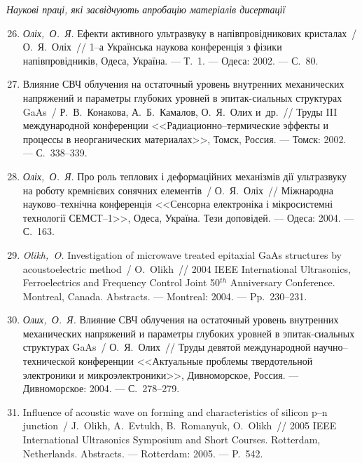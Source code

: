 \begin{center}%
\emph{Наукові праці, які засвідчують апробацію матеріалів дисертації}
\end{center}%
\begin{enumerate}[label=\arabic*.,leftmargin=2em,itemindent=0cm]
\setcounter{enumi}{25}
\item
\emph{Оліх,~О.~Я.} Ефекти активного
  ультразвуку в напівпровідникових
  кристалах~/ О.~Я.~Оліх~// 1--а {У}країнська
  наукова конференція з фізики
  напівпровідників, {О}деса, {У}країна. ---
  Т.~1. ---
  Одеса: 2002. ---
  {С.}~80.

\item
Влияние {СВЧ} облучения на остаточный
  уровень внутренних механических
  напряжений и параметры глубоких уровней в
  эпитак-сиальных структурах {G}a{A}s~/
  Р.~В.~Конакова, А.~Б.~Камалов, О.~Я.~Олих
  {и~др.}~// Труды {III} международной
  конференции <<{Р}адиационно--термические
  эффекты и процессы в неорганических
  материалах>>, {Т}омск, {Р}оссия. ---
  Томск: 2002. ---
  {С.}~338--339.

\item
\emph{Оліх,~О.~Я.} Про роль теплових і
  деформаційних механізмів дії ультразвуку
  на роботу кремнієвих сонячних елементів~/
  О.~Я.~Оліх~// Міжнародна науково--технічна
  конференція <<{С}енсорна електроніка і
  мікросистемні технології {СЕМСТ}--1>>,
  {О}деса, {У}країна. Тези доповідей. ---
  Одеса: 2004. ---
  {С.}~163.

\item
\emph{Olikh,~O.} Investigation of microwave treated epitaxial {G}a{A}s
  structures by acoustoelectric method~/ O.~Olikh~// 2004 {IEEE}
  {I}nternational {U}ltrasonics, {F}erroelectrics and {F}requency {C}ontrol
  {J}oint 50$^{th}$ {A}nniversary {C}onference. Montreal, {C}anada. Abstracts.
  ---
  Montreal: 2004. ---
  Pp.~230--231.

\item
\emph{Олих,~О.~Я.} Влияние {СВЧ} облучения на
  остаточный уровень внутренних
  механических напряжений и параметры
  глубоких уровней в эпитак-сиальных
  структурах {G}a{A}s~/ О.~Я.~Олих~// Труды девятой
  международной научно--технической
  конференции <<{А}ктуальные проблемы
  твердотельной электроники и
  микроэлектроники>>, {Д}ивноморское,
  {Р}оссия. ---
  Дивноморское: 2004. ---
  {С.}~278--279.

\item
Influence of acoustic wave on forming and characteristics of silicon p--n
  junction~/ J.~Olikh, A.~Evtukh, B.~Romanyuk, O.~Olikh~// 2005 {IEEE}
  {I}nternational {U}ltrasonics {S}ymposium and {S}hort {C}ourses. Rotterdam,
  {N}etherlands. Abstracts. ---
  Rotterdam: 2005. ---
  P.~542.


\end{enumerate}
